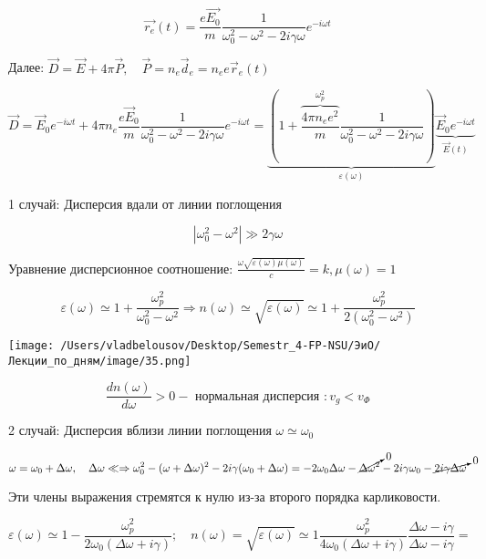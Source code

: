\documentclass[12pt, a4paper]{report}
\begin{document}
\[ \vec{r_e } (t )  =\frac{e \vec{E_0 } }{m }\frac{1}{\omega_0 ^2 - \omega ^2 - 2 i \gamma \omega} e^{- i \omega t }    \] 

Далее: \( \displaystyle \vec{D }  = \vec{E }  +4 \pi \vec{P }  , \quad  \vec{P }  = n_e \vec{d }_e = n_e e \vec{r } _e (t ) \) 

\[ \vec{D }  = \vec{E }  _0 e^{ -i \omega t } + 4 \pi n_e \frac{e \vec{E } _0 }{m } \frac{1}{\omega_0 ^2 - \omega ^2 - 2 i \gamma \omega} e^{- i \omega t }  = \underbrace{\left(  1+ \overbrace{\frac{4 \pi n_e e ^2 } { m }}^{\omega_p ^2 } \frac{1}{\omega_0 ^2 - \omega ^2 -  2 i \gamma \omega  }\right) }_{\varepsilon ( \omega)}\underbrace{\vec{E }  _0 e^{- i \omega t }}_{\vec{E }(t ) }     \] 

1 случай: Дисперсия вдали от линии поглощения 

\[ |\omega_0 ^2 - \omega ^2 | \gg 2 \gamma \omega  \] 

Уравнение дисперсионное соотношение: \( \displaystyle \frac{\omega \sqrt{\varepsilon ( \omega )\mu ( \omega )}}{c } = k , \mu (\omega ) = 1   \) 

\[ \varepsilon (\omega ) \simeq 1+ \frac{\omega_p ^2 } { \omega_0 ^2 - \omega ^2 } \Rightarrow n ( \omega ) \simeq \sqrt{\varepsilon (\omega )} \simeq 1+ \frac{\omega_p ^2 } {2(\omega_0 ^2 - \omega ^2) }       \] 

\begin{center}
    \texttt{[image: /Users/vladbelousov/Desktop/Semestr\_4-FP-NSU/ЭиО/Лекции\_по\_дням/image/35.png]}
\end{center}

\[ \frac{dn ( \omega)}{d \omega} > 0 - \text{ нормальная дисперсия }: v_{g } < v_{\Phi }     \] 

2 случай: Дисперсия вблизи линии поглощения \( \omega \simeq \omega_0  \) 

\[ \omega = \omega_0 +\Delta \omega , \quad  \Delta \omega \ll \Rightarrow \omega_0 ^2 - ( \omega+ \Delta \omega ) ^2 - 2 i \gamma ( \omega_0 + \Delta \omega ) = -2 \omega_0 \Delta \omega - \cancelto{0}{\Delta \omega ^2} - 2 i \gamma \omega_0 - \cancelto{0}{2 i \gamma \Delta\omega}   \] 

Эти члены выражения стремятся  к нулю из-за второго порядка карликовости.

\[ \varepsilon ( \omega ) \simeq 1 - \frac{ \omega_p ^2 }{2 \omega_0 (\Delta \omega + i \gamma)}; \quad  n( \omega ) = \sqrt{\varepsilon( \omega)} \simeq 1 \frac{ \omega_p ^2 }{4 \omega_0 (\Delta \omega + i \gamma)} \frac{ \Delta \omega - i \gamma }{\Delta \omega - i \gamma} =     \] 
\end{document}
